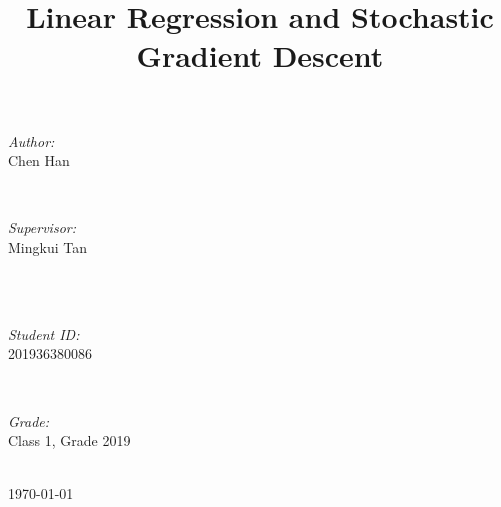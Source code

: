 \documentclass[journal, a4paper]{IEEEtran}
\begin{document}
\begin{titlepage}
\begin{minipage}{0.4\textwidth}
\begin{flushleft} \large
\emph{Author:}\\
 Chen Han %
\end{flushleft}
\end{minipage}
~
\begin{minipage}{0.4\textwidth}
\begin{flushright} \large
\emph{Supervisor:} \\
Mingkui Tan%
\end{flushright}
\end{minipage}\\[2cm]
~
\begin{minipage}{0.4\textwidth}
\begin{flushleft} \large
\emph{Student ID:}\\
201936380086
\end{flushleft}
\end{minipage}
~
\begin{minipage}{0.4\textwidth}
\begin{flushright} \large
\emph{Grade:} \\
Class 1, Grade 2019
\end{flushright}
\end{minipage}\\[2cm]



{\large \today}\\[2cm] %

 

\vfill %

\end{titlepage}

	\title{Linear Regression and Stochastic Gradient Descent}
	\maketitle
\end{document}
